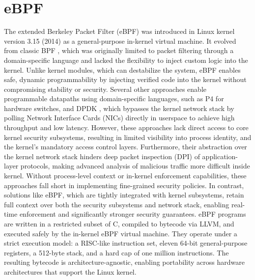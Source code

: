 \documentclass [11pt, proquest] {uwthesis}[2020/02/24]
\begin{document}
\section{eBPF}
The extended Berkeley Packet Filter (eBPF) was introduced in Linux kernel version 3.15 (2014) as a general-purpose in-kernel virtual machine. It evolved from classic BPF \cite{10.5555/1267303.1267305}, which was originally limited to packet filtering through a domain-specific language and lacked the flexibility to inject custom logic into the kernel.
Unlike kernel modules, which can destabilize the system, eBPF enables safe, dynamic programmability by injecting verified code into the kernel without compromising stability or security. Several other approaches enable programmable datapaths using domain-specific languages, such as P4 \cite{bosshart2014p4} for hardware switches, and DPDK \cite{8701793}, which bypasses the kernel network stack by polling Network Interface Cards (NICs) directly in userspace to achieve high throughput and low latency. However, these approaches lack direct access to core kernel security subsystems, resulting in limited visibility into process identity, and the kernel’s mandatory access control layers. Furthermore, their abstraction over the kernel network stack hinders deep packet inspection (DPI) of application-layer protocols, making advanced analysis of malicious traffic more difficult inside kernel. Without process-level context or in-kernel enforcement capabilities, these approaches fall short in implementing fine-grained security policies. In contrast, solutions like eBPF, which are tightly integrated with kernel subsystems, retain full context over both the security subsystems and network stack, enabling real-time enforcement and significantly stronger security guarantees. eBPF programs are written in a restricted subset of C, compiled to bytecode via LLVM, and executed safely by the in-kernel eBPF virtual machine. They operate under a strict execution model: a RISC-like instruction set, eleven 64-bit general-purpose registers, a 512-byte stack, and a hard cap of one million instructions. The resulting bytecode is architecture-agnostic, enabling portability across hardware architectures that support the Linux kernel.
\end{document}
